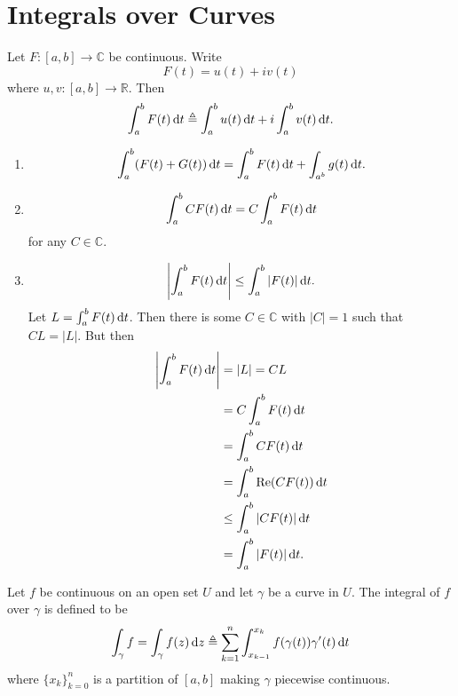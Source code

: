 \section{Integrals over Curves}
\begin{defn}
Let $F : [a, b] \to \mathbb{C}$ be continuous. Write
$$
F(t) = u(t) + i v(t)
$$
where $u, v : [a, b] \to \mathbb{R}$. Then
$$
  \int_{a}^{b} F(t) \mathop{}\!\mathrm{d} t \triangleq
  \int_{a}^{b} u(t) \mathop{}\!\mathrm{d} t
+ i \int_{a}^{b} v(t) \mathop{}\!\mathrm{d} t.
$$
\end{defn}

\begin{obsv}
  \begin{enumerate}
    \item{
      $$
        \int_a^b (F(t) + G(t)) \mathop{}\!\mathrm{d} t
      = \int_a^b F(t) \mathop{}\!\mathrm{d} t + \int_{a^b} g(t) \mathop{}\!\mathrm{d} t.
      $$
    }
    \item{
      $$
        \int_a^b C F(t) \mathop{}\!\mathrm{d} t
      = C \int_a^b F(t) \mathop{}\!\mathrm{d} t
      $$
      for any $C \in \mathbb{C}$.
    }
    \item{
      $$
           \left|\int_a^b F(t) \mathop{}\!\mathrm{d} t\right|
      \leq \int_a^b |F(t)| \mathop{}\!\mathrm{d} t.
      $$
      Let $L = \int_a^b F(t) \mathop{}\!\mathrm{d} t$. Then there is some
      $C \in \mathbb{C}$ with $|C| = 1$ such that
      $CL = |L|$. But then
      \begin{align*}
          \left|\int_a^b F(t) \mathop{}\!\mathrm{d} t \right|
      &= |L| = CL \\
      &= C \int_a^b F(t) \mathop{}\!\mathrm{d} t \\
      &= \int_a^b C F(t) \mathop{}\!\mathrm{d} t \\
      &= \int_a^b \mathrm{Re}(C F(t)) \mathop{}\!\mathrm{d} t \\
      &\leq \int_a^b |C F(t)| \mathop{}\!\mathrm{d} t \\
      &= \int_a^b |F(t)| \mathop{}\!\mathrm{d} t.
      \end{align*}
    }
  \end{enumerate}
\end{obsv}

\begin{defn}
Let $f$ be continuous on an open set $U$ and let
$\gamma$ be a curve in $U$. The integral of
$f$ over $\gamma$ is defined to be
$$
\int_\gamma f
=
\int_\gamma f(z) \mathop{}\!\mathrm{d} z
\triangleq
\sum_{k=1}^n
\int_{x_{k-1}}^{x_k} f(\gamma(t)) \gamma^\prime(t) \mathop{}\!\mathrm{d} t
$$
where $\{x_k\}_{k=0}^n$ is a partition of $[a,b]$
making $\gamma$ piecewise continuous.
\end{defn}

